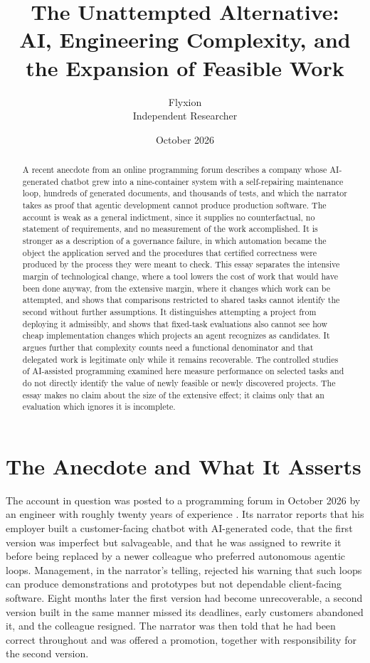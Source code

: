 \documentclass[11pt]{article}
\title{The Unattempted Alternative:\\[0.3em]
\large AI, Engineering Complexity, and the Expansion of Feasible Work}
\author{Flyxion\\Independent Researcher}
\date{October 2026}
\theoremstyle{remark}
\begin{document}
\maketitle

\begin{abstract}
\noindent A recent anecdote from an online programming forum describes a company whose AI-generated chatbot grew into a nine-container system with a self-repairing maintenance loop, hundreds of generated documents, and thousands of tests, and which the narrator takes as proof that agentic development cannot produce production software. The account is weak as a general indictment, since it supplies no counterfactual, no statement of requirements, and no measurement of the work accomplished. It is stronger as a description of a governance failure, in which automation became the object the application served and the procedures that certified correctness were produced by the process they were meant to check. This essay separates the intensive margin of technological change, where a tool lowers the cost of work that would have been done anyway, from the extensive margin, where it changes which work can be attempted, and shows that comparisons restricted to shared tasks cannot identify the second without further assumptions. It distinguishes attempting a project from deploying it admissibly, and shows that fixed-task evaluations also cannot see how cheap implementation changes which projects an agent recognizes as candidates. It argues further that complexity counts need a functional denominator and that delegated work is legitimate only while it remains recoverable. The controlled studies of AI-assisted programming examined here measure performance on selected tasks and do not directly identify the value of newly feasible or newly discovered projects. The essay makes no claim about the size of the extensive effect; it claims only that an evaluation which ignores it is incomplete.
\end{abstract}

\section{The Anecdote and What It Asserts}

The account in question was posted to a programming forum in October 2026 by an engineer with roughly twenty years of experience \cite{reddit2026}. Its narrator reports that his employer built a customer-facing chatbot with AI-generated code, that the first version was imperfect but salvageable, and that he was assigned to rewrite it before being replaced by a newer colleague who preferred autonomous agentic loops. Management, in the narrator's telling, rejected his warning that such loops can produce demonstrations and prototypes but not dependable client-facing software. Eight months later the first version had become unrecoverable, a second version built in the same manner missed its deadlines, early customers abandoned it, and the colleague resigned. The narrator was then told that he had been correct throughout and was offered a promotion, together with responsibility for the second version.
\end{document}
